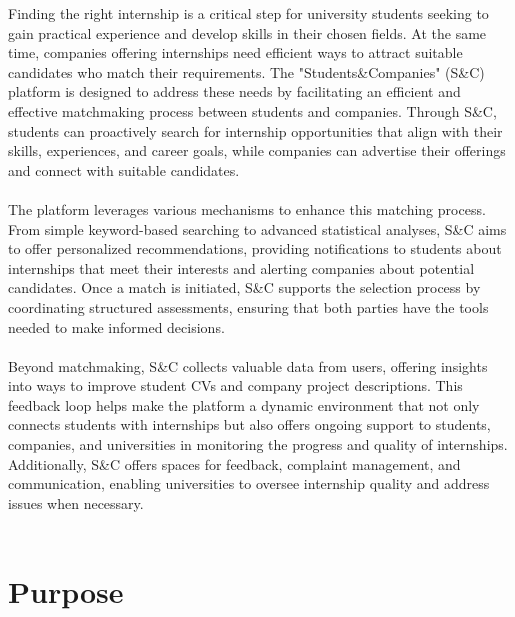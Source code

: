 Finding the right internship is a critical step for university students seeking to gain practical experience and develop skills in their chosen fields. At the same time, companies offering internships need efficient ways to attract suitable candidates who match their requirements. The "Students\&Companies" (S\&C) platform is designed to address these needs by facilitating an efficient and effective matchmaking process between students and companies. Through S\&C, students can proactively search for internship opportunities that align with their skills, experiences, and career goals, while companies can advertise their offerings and connect with suitable candidates.\\ \\
The platform leverages various mechanisms to enhance this matching process. From simple keyword-based searching to advanced statistical analyses, S\&C aims to offer personalized recommendations, providing notifications to students about internships that meet their interests and alerting companies about potential candidates. Once a match is initiated, S\&C supports the selection process by coordinating structured assessments, ensuring that both parties have the tools needed to make informed decisions.\\ \\
Beyond matchmaking, S\&C collects valuable data from users, offering insights into ways to improve student CVs and company project descriptions. This feedback loop helps make the platform a dynamic environment that not only connects students with internships but also offers ongoing support to students, companies, and universities in monitoring the progress and quality of internships. Additionally, S\&C offers spaces for feedback, complaint management, and communication, enabling universities to oversee internship quality and address issues when necessary.\\ \\


\section{Purpose}

